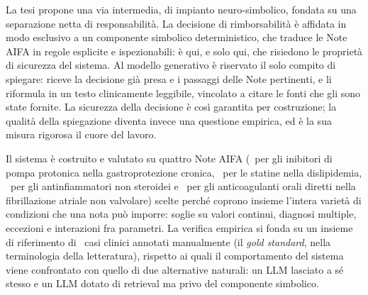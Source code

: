 La tesi propone una via intermedia, di impianto neuro-simbolico, fondata su una separazione netta di responsabilità. La decisione di rimborsabilità è affidata in modo esclusivo a un componente simbolico deterministico, che traduce le Note AIFA in regole esplicite e ispezionabili: è qui, e solo qui, che risiedono le proprietà di sicurezza del sistema. Al modello generativo è riservato il solo compito di spiegare: riceve la decisione già presa e i passaggi delle Note pertinenti, e li riformula in un testo clinicamente leggibile, vincolato a citare le fonti che gli sono state fornite. La sicurezza della decisione è così garantita per costruzione; la qualità della spiegazione diventa invece una questione empirica, ed è la sua misura rigorosa il cuore del lavoro.

Il sistema è costruito e valutato su quattro Note AIFA (\notezero\ per gli inibitori di pompa protonica nella gastroprotezione cronica, \notetredici\ per le statine nella dislipidemia, \notesessanta\ per gli antinfiammatori non steroidei e \notenova\ per gli anticoagulanti orali diretti nella fibrillazione atriale non valvolare) scelte perché coprono insieme l'intera varietà di condizioni che una nota può imporre: soglie su valori continui, diagnosi multiple, eccezioni e interazioni fra parametri. La verifica empirica si fonda su un insieme di riferimento di \goldn\ casi clinici annotati manualmente (il \emph{gold standard}, nella terminologia della letteratura), rispetto ai quali il comportamento del sistema viene confrontato con quello di due alternative naturali: un LLM lasciato a sé stesso e un LLM dotato di retrieval ma privo del componente simbolico.

